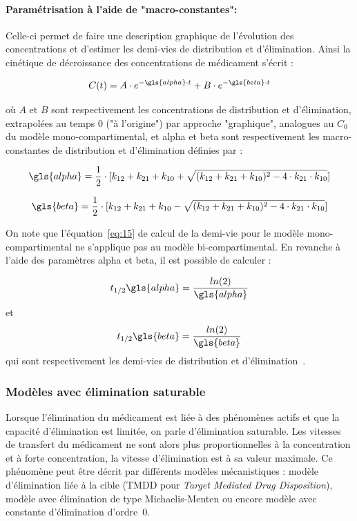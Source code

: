 \paragraph*{Paramétrisation à l'aide de "macro-constantes":} Celle-ci permet de faire une description graphique de l'évolution des concentrations et d'estimer les demi-vies de distribution et d'élimination. Ainsi la cinétique de décroissance des concentrations de médicament s'écrit :

\begin{equation}
C(t) = A \cdot e^{-\gls{alpha}\cdot t}+B \cdot e^{-\gls{beta}\cdot t}
\label{eq:28}
\end{equation}

où $A$ et $B$ sont respectivement les concentrations de distribution et d'élimination, extrapolées au temps $0$ ("à l'origine") par approche "graphique", analogues au $C_0$ du modèle mono-compartimental, et \gls{alpha} et \gls{beta} sont respectivement les macro-constantes de distribution et d'élimination définies par :

\begin{equation}
\gls{alpha} = \frac{1}{2}\cdot[k_{12}+k_{21}+k_{10}+\sqrt{(k_{12}+k_{21}+k_{10})^2-4\cdot k_{21}\cdot k_{10}}]
\label{eq:29}
\end{equation}

\begin{equation}
\gls{beta} = \frac{1}{2}\cdot[k_{12}+k_{21}+k_{10}-\sqrt{(k_{12}+k_{21}+k_{10})^2-4\cdot k_{21}\cdot k_{10}}]
\label{eq:30}
\end{equation}

On note que l'équation~\ref{eq:15} de calcul de la demi-vie pour le modèle mono-compartimental ne s'applique pas au modèle bi-compartimental. En revanche à l'aide des paramètres \gls{alpha} et \gls{beta}, il est possible de calculer :

\begin{equation}
t_{1/2}\gls{alpha} = \frac{ln(2)}{\gls{alpha}}
\label{eq:31}
\end{equation}
et
\begin{equation}
t_{1/2}\gls{beta}  = \frac{ln(2)}{\gls{beta}} 
\label{eq:32}
\end{equation}
qui sont respectivement les demi-vies de distribution et d'élimination~\citep{REF2}.

\subsubsection{Modèles avec élimination saturable}
Lorsque l'élimination du médicament est liée à des phénomènes actifs et que la capacité d'élimination est limitée, on parle d'élimination saturable. Les vitesses de transfert du médicament ne sont alors plus proportionnelles à la concentration et à forte concentration, la vitesse d'élimination est à sa valeur maximale. Ce phénomène peut être décrit par différents modèles mécanistiques : modèle d'élimination liée à la cible (TMDD pour \textit{Target Mediated Drug Disposition}), modèle avec élimination de type Michaelis-Menten ou encore modèle avec constante d'élimination d'ordre~0. 

